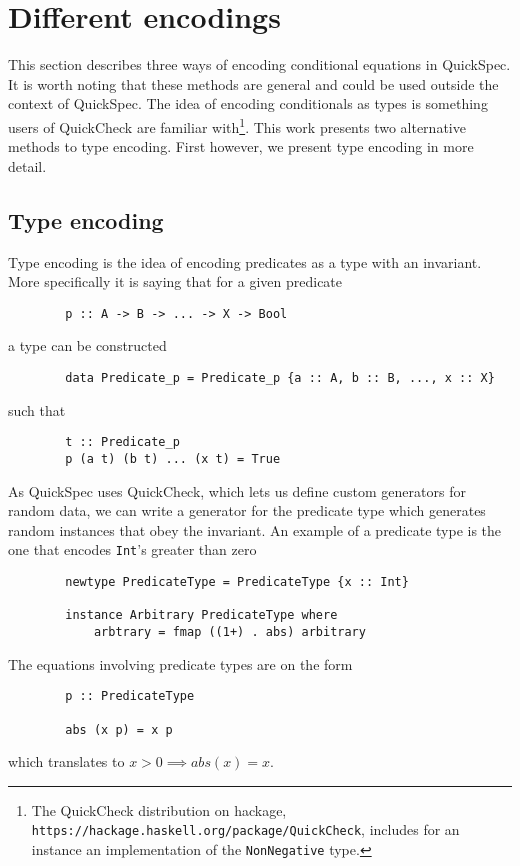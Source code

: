\section{Different encodings}\label{encodings}

    This section describes three
    ways of encoding conditional
    equations in QuickSpec. It is
    worth noting that these methods
    are general and could be used outside
    the context of QuickSpec. The
    idea of encoding conditionals
    as types is something users of
    QuickCheck\cite{Claessen2000}
    are familiar with\footnote{The QuickCheck distribution
    on hackage, \texttt{https://hackage.haskell.org/package/QuickCheck}, includes for an instance an implementation
    of the \texttt{NonNegative} type.}. 
    This work presents two alternative methods
    to type encoding. First however, we present type encoding
    in more detail.

    \subsection{Type encoding}\label{TE}

        Type encoding is the idea of encoding
        predicates as a type with an invariant.
        More specifically
        it is saying that for a given predicate
        \begin{verbatim}
        p :: A -> B -> ... -> X -> Bool
        \end{verbatim}
        a type can be constructed
        \begin{verbatim}
        data Predicate_p = Predicate_p {a :: A, b :: B, ..., x :: X}
        \end{verbatim}
        such that 
        \begin{verbatim}
        t :: Predicate_p
        p (a t) (b t) ... (x t) = True
        \end{verbatim}
        As QuickSpec uses QuickCheck, which lets us define
        custom generators for random data, we can write a generator for 
        the predicate type which generates random instances that obey the invariant.
        An example of a predicate type is the one that encodes \texttt{Int}'s greater than zero
        \begin{verbatim}
        newtype PredicateType = PredicateType {x :: Int}

        instance Arbitrary PredicateType where
            arbtrary = fmap ((1+) . abs) arbitrary
        \end{verbatim}
        The equations involving predicate types are on the form
        \begin{verbatim}
        p :: PredicateType

        abs (x p) = x p

        \end{verbatim}
        which translates to $x > 0 \implies abs(x) = x$.

